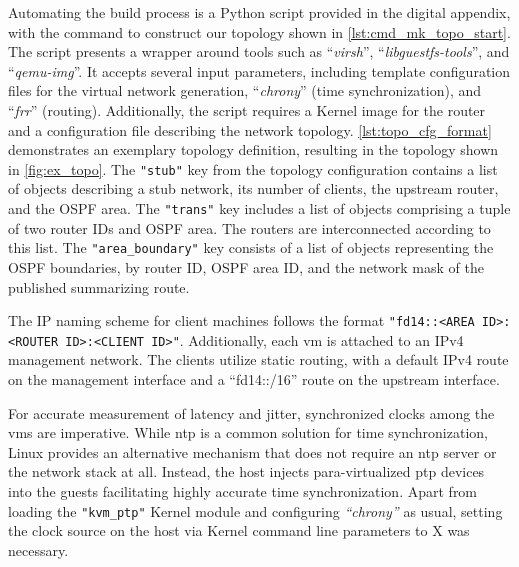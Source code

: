 Automating the build process is a Python script provided in the digital
    appendix, with the command to construct our topology shown in
    \autoref{lst:cmd_mk_topo_start}.
The script presents a wrapper around tools such as ``\textit{virsh}'',
    ``\textit{libguestfs-tools}'', and ``\textit{qemu-img}''.
It accepts several input parameters, including template configuration files
    for the virtual network generation, ``\textit{chrony}'' (time
    synchronization), and ``\textit{frr}'' (routing).
Additionally, the script requires a Kernel image for the router and a
    configuration file describing the network topology.
\autoref{lst:topo_cfg_format} demonstrates an exemplary topology definition,
    resulting in the topology shown in \autoref{fig:ex_topo}.
The  \texttt{"stub"} key from the topology configuration contains a list of
    objects describing a stub network, its number of clients, the upstream
    router, and the OSPF area.
The \texttt{"trans"} key includes a list of objects comprising a tuple of two
    router IDs and OSPF area.
The routers are interconnected according to this list.
The \texttt{"area\_boundary"} key consists of a list of objects representing
    the OSPF boundaries, by router ID, OSPF area ID, and the network mask
    of the published summarizing route.

The IP naming scheme for client machines follows the format
    \texttt{"fd14::<AREA ID>:<ROUTER ID>:<CLIENT ID>"}.
Additionally, each \gls{vm} is attached to an IPv4 management network.
The clients utilize static routing, with a default IPv4 route on the management
    interface and a ``fd14::/16'' route on the upstream interface.

For accurate measurement of latency and jitter, synchronized clocks among the
    \glspl{vm} are imperative.
While \gls{ntp} is a common solution for time synchronization, Linux provides
    an alternative mechanism that does not require an \gls{ntp} server or the 
    network stack at all.
Instead, the host injects para-virtualized \gls{ptp} devices into the guests
    facilitating highly accurate time synchronization.
Apart from loading the \texttt{"kvm\_ptp"} Kernel module and configuring
    \textit{``chrony''} as usual, setting the clock source on the host via
    Kernel command line parameters to X was necessary.

